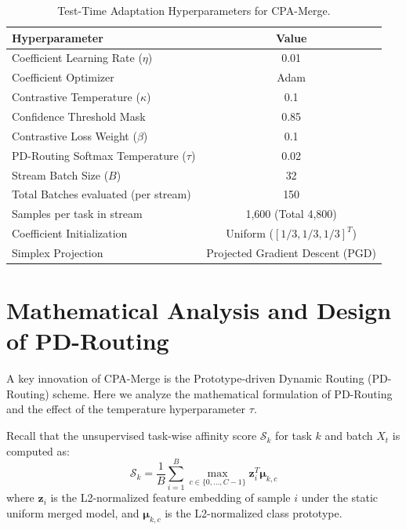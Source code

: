 \documentclass{article}
\theoremstyle{plain}
\theoremstyle{definition}
\theoremstyle{remark}
\begin{document}
\begin{table}[h]
\caption{Test-Time Adaptation Hyperparameters for CPA-Merge.}
\label{tab:ttmm-hyperparams}
\vskip 0.1in
\begin{center}
\begin{small}
\begin{tabular}{lc}
\toprule
Hyperparameter & Value \\
\midrule
Coefficient Learning Rate ($\eta$) & 0.01 \\
Coefficient Optimizer & Adam \\
Contrastive Temperature ($\kappa$) & 0.1 \\
Confidence Threshold Mask & 0.85 \\
Contrastive Loss Weight ($\beta$) & 0.1 \\
PD-Routing Softmax Temperature ($\tau$) & 0.02 \\
Stream Batch Size ($B$) & 32 \\
Total Batches evaluated (per stream) & 150 \\
Samples per task in stream & 1,600 (Total 4,800) \\
Coefficient Initialization & Uniform ($[1/3, 1/3, 1/3]^T$) \\
Simplex Projection & Projected Gradient Descent (PGD) \\
\bottomrule
\end{tabular}
\end{small}
\end{center}
\end{table}

\section{Mathematical Analysis and Design of PD-Routing}
\label{appendix-pdrouting-math}

A key innovation of CPA-Merge is the Prototype-driven Dynamic Routing (PD-Routing) scheme. Here we analyze the mathematical formulation of PD-Routing and the effect of the temperature hyperparameter $\tau$.

Recall that the unsupervised task-wise affinity score $\mathcal{S}_k$ for task $k$ and batch $X_t$ is computed as:
\begin{equation}
    \mathcal{S}_k = \frac{1}{B} \sum_{i=1}^B \max_{c \in \{0, \dots, C-1\}} \mathbf{z}_i^T \mathbf{\mu}_{k, c}
\end{equation}
where $\mathbf{z}_i$ is the L2-normalized feature embedding of sample $i$ under the static uniform merged model, and $\mathbf{\mu}_{k, c}$ is the L2-normalized class prototype.
\end{document}
